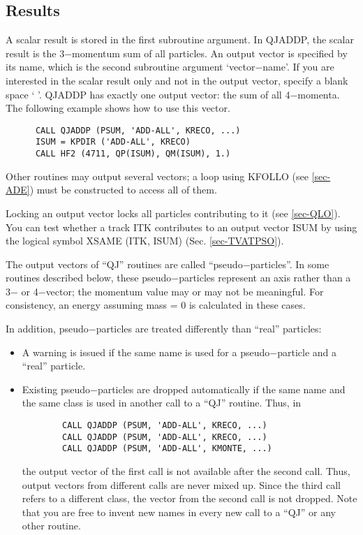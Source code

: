 \subsection{\label{sec-QJR}Results}
\par
A scalar result is stored in the first subroutine argument. In
QJADDP, the scalar result is the 3$-$momentum sum of all particles.
An output vector is specified by its name, which is
the second subroutine argument `vector$-$name'. If you are
interested in the scalar result only and not in the output vector,
specify a blank space ` '.
QJADDP has exactly one output vector: the sum of all 4$-$momenta.
The
following example shows how to use this vector.
\begin{verbatim}
      CALL QJADDP (PSUM, 'ADD-ALL', KRECO, ...)
      ISUM = KPDIR ('ADD-ALL', KRECO)
      CALL HF2 (4711, QP(ISUM), QM(ISUM), 1.)
\end{verbatim}
Other routines may output several vectors; a loop using
KFOLLO (see
\ref{sec-ADE}) must be constructed to access all of them.
\par
Locking an output vector locks all particles contributing to it
(see \ref{sec-QLO}).
You can test whether a track ITK contributes to an output
vector ISUM by using the logical symbol XSAME (ITK, ISUM) (Sec.
\ref{sec-TVATPSO}).
\par
The output vectors of ``QJ'' routines are called
``pseudo$-$particles''. In some routines described
below, these pseudo$-$particles represent an axis
rather than a 3$-$ or 4$-$vector; the momentum value may or may
not be meaningful. For consistency, an energy assuming mass = 0
is calculated in these cases.
\par
In addition, pseudo$-$particles are treated differently than ``real''
particles:
\begin{itemize}
\item A warning is issued if the same name is used for a pseudo$-$particle
and a ``real'' particle.
\item Existing pseudo$-$particles are dropped automatically if the
same name
and the same class is used in another call to a ``QJ'' routine. Thus,
in
\begin{verbatim}
        CALL QJADDP (PSUM, 'ADD-ALL', KRECO, ...)
        CALL QJADDP (PSUM, 'ADD-ALL', KRECO, ...)
        CALL QJADDP (PSUM, 'ADD-ALL', KMONTE, ...)
\end{verbatim}
the output vector of the first call is not available after the second
call. Thus, output vectors from different calls are
never mixed up. Since the third call refers to a different class,
the vector from the second call is not dropped.
Note that you are free to invent new names in
every new call to a ``QJ'' or any other routine.
\end{itemize}

